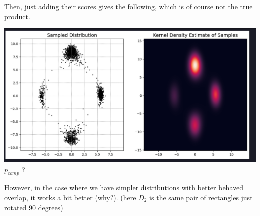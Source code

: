 \documentclass{article}
\begin{document}
Then, just adding their scores gives the following, which is of course not the true product.


\begin{center}
  \centering
\begin{minipage}{0.7\textwidth}
  \includegraphics[width=\linewidth]{images_guidance1/addingscoresGaussianMixtureandRectangle.png}
  \centering\small $p_{comp}$ ?
\end{minipage}

\end{center}

However, in the case where we have simpler distributions with better behaved overlap, it works a bit better (why?). (here $D_2$ is the same pair of rectangles just rotated 90 degrees)
\end{document}

